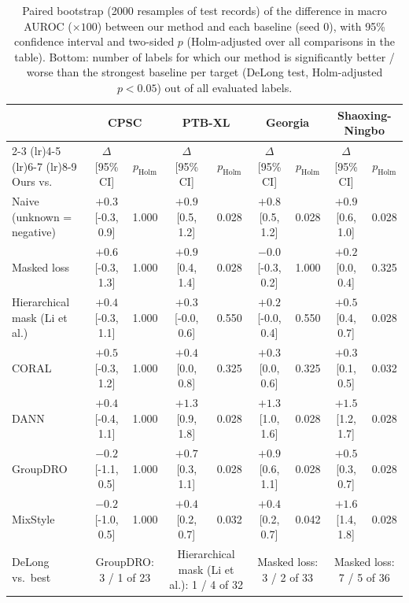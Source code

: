 \begin{table}
\centering
\footnotesize
\setlength{\tabcolsep}{3pt}
\caption{Paired bootstrap (2000 resamples of test records) of the difference in macro AUROC ($\times 100$) between our method and each baseline (seed 0), with 95\% confidence interval and two-sided $p$ (Holm-adjusted over all comparisons in the table). Bottom: number of labels for which our method is significantly better / worse than the strongest baseline per target (DeLong test, Holm-adjusted $p<0.05$) out of all evaluated labels.}
\label{tab:stats}
\begin{tabular}{lcccccccc}
\toprule
 & \multicolumn{2}{c}{CPSC} & \multicolumn{2}{c}{PTB-XL} & \multicolumn{2}{c}{Georgia} & \multicolumn{2}{c}{Shaoxing-Ningbo} \\
\cmidrule(lr){2-3} \cmidrule(lr){4-5} \cmidrule(lr){6-7} \cmidrule(lr){8-9}
Ours vs. & $\Delta$ [95\% CI] & $p_\mathrm{Holm}$ & $\Delta$ [95\% CI] & $p_\mathrm{Holm}$ & $\Delta$ [95\% CI] & $p_\mathrm{Holm}$ & $\Delta$ [95\% CI] & $p_\mathrm{Holm}$ \\
\midrule
Naive (unknown = negative) & $+0.3$ [-0.3, 0.9] & 1.000 & $+0.9$ [0.5, 1.2] & 0.028 & $+0.8$ [0.5, 1.2] & 0.028 & $+0.9$ [0.6, 1.0] & 0.028 \\
Masked loss & $+0.6$ [-0.3, 1.3] & 1.000 & $+0.9$ [0.4, 1.4] & 0.028 & $-0.0$ [-0.3, 0.2] & 1.000 & $+0.2$ [0.0, 0.4] & 0.325 \\
Hierarchical mask (Li et al.) & $+0.4$ [-0.3, 1.1] & 1.000 & $+0.3$ [-0.0, 0.6] & 0.550 & $+0.2$ [-0.0, 0.4] & 0.550 & $+0.5$ [0.4, 0.7] & 0.028 \\
CORAL & $+0.5$ [-0.3, 1.2] & 1.000 & $+0.4$ [0.0, 0.8] & 0.325 & $+0.3$ [0.0, 0.6] & 0.325 & $+0.3$ [0.1, 0.5] & 0.032 \\
DANN & $+0.4$ [-0.4, 1.1] & 1.000 & $+1.3$ [0.9, 1.8] & 0.028 & $+1.3$ [1.0, 1.6] & 0.028 & $+1.5$ [1.2, 1.7] & 0.028 \\
GroupDRO & $-0.2$ [-1.1, 0.5] & 1.000 & $+0.7$ [0.3, 1.1] & 0.028 & $+0.9$ [0.6, 1.1] & 0.028 & $+0.5$ [0.3, 0.7] & 0.028 \\
MixStyle & $-0.2$ [-1.0, 0.5] & 1.000 & $+0.4$ [0.2, 0.7] & 0.032 & $+0.4$ [0.2, 0.7] & 0.042 & $+1.6$ [1.4, 1.8] & 0.028 \\
\midrule
DeLong vs.\ best & \multicolumn{2}{c}{GroupDRO: 3 / 1 of 23} & \multicolumn{2}{c}{Hierarchical mask (Li et al.): 1 / 4 of 32} & \multicolumn{2}{c}{Masked loss: 3 / 2 of 33} & \multicolumn{2}{c}{Masked loss: 7 / 5 of 36} \\
\bottomrule
\end{tabular}
\end{table}
